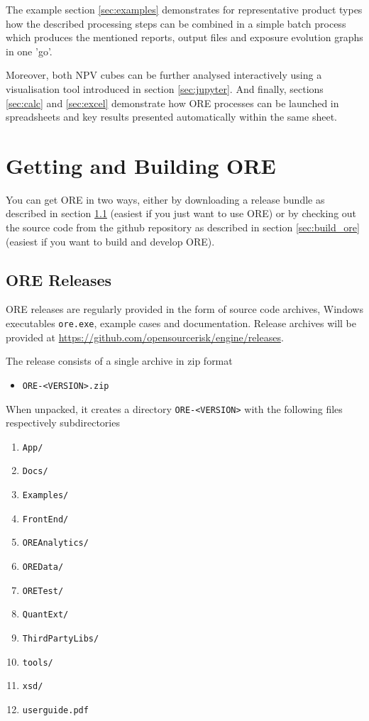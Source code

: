 \documentclass[12pt, a4paper]{article}
\begin{document}
The example section \ref{sec:examples} demonstrates for representative product types how the described processing steps
can be combined in a simple batch process which produces the mentioned reports, output files and exposure evolution
graphs in one 'go'.

Moreover, both NPV cubes can be further analysed interactively using a visualisation tool introduced in section
\ref{sec:jupyter}. And finally, sections \ref{sec:calc} and \ref{sec:excel} demonstrate how ORE processes can be
launched in spreadsheets and key results presented automatically within the same sheet.

\section{Getting and Building ORE}\label{sec:installation}

You can get ORE in two ways, either by downloading a release bundle as described in section \ref{sec:release} (easiest if you just want to use ORE) or by
checking out the source code from the github repository as described in section \ref{sec:build_ore} (easiest if you want to build and develop ORE).

\subsection{ORE Releases}\label{sec:release}

ORE releases are regularly provided in the form of source code archives, Windows exe\-cutables {\tt ore.exe}, example
cases and documentation. Release archives will be provided at \url{https://github.com/opensourcerisk/engine/releases}.

\medskip
The release consists of a single archive in zip format
\begin{itemize}
\item {\tt ORE-<VERSION>.zip}
\end{itemize}

When unpacked, it creates a directory {\tt ORE-<VERSION>} with the following files respectively subdirectories
\begin{enumerate}
\item {\tt App/}
\item {\tt Docs/}
\item {\tt Examples/}
\item {\tt FrontEnd/}
\item {\tt OREAnalytics/}
\item {\tt OREData/}
\item {\tt ORETest/}
\item {\tt QuantExt/}
\item {\tt ThirdPartyLibs/}
\item {\tt tools/}
\item {\tt xsd/}
\item {\tt userguide.pdf}
\end{enumerate} 
\end{document}
